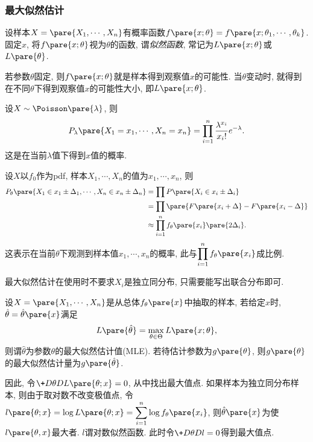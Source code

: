 \documentclass[../Statistics.tex]{subfiles}
\begin{document}

\subsubsection{最大似然估计} %
\label{ssub:最大似然估计}

设样本$X = \pare{X_1,\cdots,X_n}$有概率函数$f\pare{x;\theta} = f\pare{x;\theta_1,\cdots,\theta_k}$. 固定$x$, 将$f\pare{x;\theta}$视为$\theta$的函数, 谓\emph{似然函数}, 常记为$L\pare{x;\theta}$或$L\pare{\theta}$.
\par
若参数$\theta$固定, 则$f\pare{x;\theta}$就是样本得到观察值$x$的可能性. 当$\theta$变动时, 就得到在不同$\theta$下得到观察值$x$的可能性大小, 即$L\pare{x;\theta}$.
\begin{ex}
    设$X\sim \Poisson \pare{\lambda}$, 则
    \[ P_\lambda \pare{X_1 = x_1,\cdots, X_n = x_n} = \prod_{i=1}^n \frac{\lambda^{x_i}}{x_i!}e^{-\lambda}. \]
    这是在当前$\lambda$值下得到$x$值的概率.
\end{ex}
    \begin{ex}
        设$X$以$f_0$作为pdf, 样本$X_1,\cdots,X_n$的值为$x_1,\cdots,x_n$, 则
        \begin{align*}
            P_\theta\pare{X_1 \in x_1\pm \Delta_1,\cdots,X_n\in x_n\pm\Delta_n} &= \prod P\pare{X_i \in x_i \pm \Delta_i} \\&= \prod \pare{F\pare{x_i + \Delta} - F\pare{x_i - \Delta}} \\&\approx \prod_{i=1}^n f_\theta\pare{x_i}\pare{2\Delta_i}. 
        \end{align*}
        这表示在当前$\theta$下观测到样本值$x_1,\cdots,x_n$的概率, 此与$\displaystyle \prod_{i=1}^n f_\theta\pare{x_i}$成比例.
    \end{ex}
最大似然估计在使用时不要求$X_i$是独立同分布, 只需要能写出联合分布即可.
\par
设$X = \pare{X_1,\cdots,X_n}$是从总体$f_\theta\pare{x}$中抽取的样本, 若给定$x$时, $\hat\theta = \hat\theta\pare{x}$满足
\[ L\pare{\hat{\theta}} = \max_{\theta\in\Theta} L\pare{x;\theta}, \]
则谓$\hat\theta$为参数$\theta$的最大似然估计值(MLE). 若待估计参数为$g\pare{\theta}$, 则$g\pare{\theta}$的最大似然估计量为$g\pare{\hat\theta}$.
\par
因此, 令$\displaystyle \+D\theta D{L\pare{\theta; x}} = 0$, 从中找出最大值点. 如果样本为独立同分布样本, 则由于取对数不改变极值点, 令$l\pare{\theta; x} = \log L\pare{\theta; x} = \displaystyle \sum_{i=1}^n \log f_\theta\pare{x_i}$, 则$\hat\theta\pare{x}$为使$l\pare{\theta,x}$最大者. $l$谓对数似然函数. 此时令$\displaystyle \+D\theta Dl = 0$得到最大值点.
\end{document}
